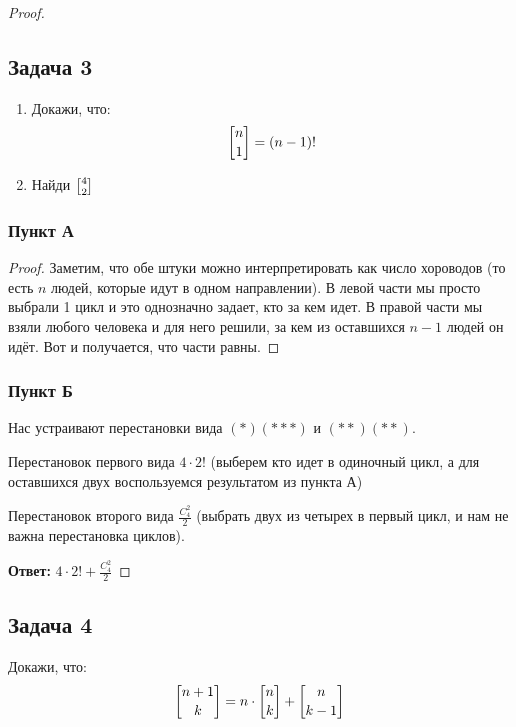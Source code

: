 \begin{proof}
\subsection{Задача 3} 

\begin{enumerate}
\item Докажи, что: $$\stirling{n}{1} = (n-1)!$$
\item Найди $\stirling{4}{2}$
\end{enumerate}

\subsubsection{Пункт А}

\begin{proof}
Заметим, что обе штуки можно интерпретировать как число хороводов (то есть $n$ людей, которые идут в одном направлении). В левой части мы просто выбрали 1 цикл и это однозначно задает, кто за кем идет. В правой части мы взяли любого человека и для него решили, за кем из оставшихся $n - 1$ людей он идёт. Вот и получается, что части равны.
\end{proof}

\subsubsection{Пункт Б}

Нас устраивают перестановки вида $(*)(***)$ и $(**)(**)$.

Перестановок первого вида $4 \cdot 2!$ (выберем кто идет в одиночный цикл, а для оставшихся двух воспользуемся результатом из пункта А)

Перестановок второго вида $\frac{C^2_{4}}{2}$ (выбрать двух из четырех в первый цикл, и нам не важна перестановка циклов).

\textbf{Ответ:} $4 \cdot 2! + \frac{C^2_{4}}{2}$

\end{proof}

\subsection{Задача 4}

Докажи, что:
\[
\stirling{n+1}{k} = n \cdot \stirling{n}{k} + \stirling{n}{k-1}
\]

